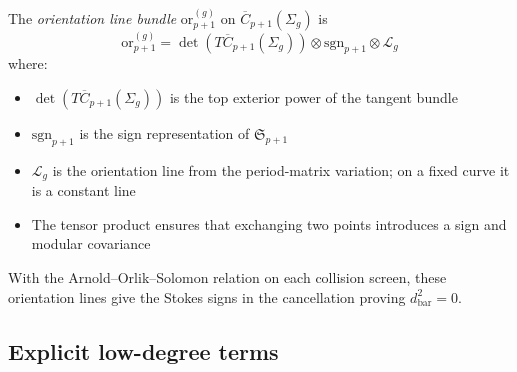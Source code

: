 \begin{definition}\label{def:orientation}
The \emph{orientation line bundle} $\text{or}_{p+1}^{(g)}$ on $\overline{C}_{p+1}(\Sigma_g)$ is
\[
\text{or}_{p+1}^{(g)} = \det(T\overline{C}_{p+1}(\Sigma_g)) \otimes \text{sgn}_{p+1} \otimes \mathcal{L}_g
\]
where:
\begin{itemize}
\item $\det(T\overline{C}_{p+1}(\Sigma_g))$ is the top exterior power of the tangent bundle
\item $\text{sgn}_{p+1}$ is the sign representation of $\mathfrak{S}_{p+1}$
\item $\mathcal{L}_g$ is the orientation line from the period-matrix
variation; on a fixed curve it is a constant line
\item The tensor product ensures that exchanging two points introduces a sign and modular covariance
\end{itemize}
With the Arnold--Orlik--Solomon relation on each collision screen, these
orientation lines give the Stokes signs in the cancellation proving
$d_{\mathrm{bar}}^2=0$.
\end{definition}

\subsection{Explicit low-degree terms}

